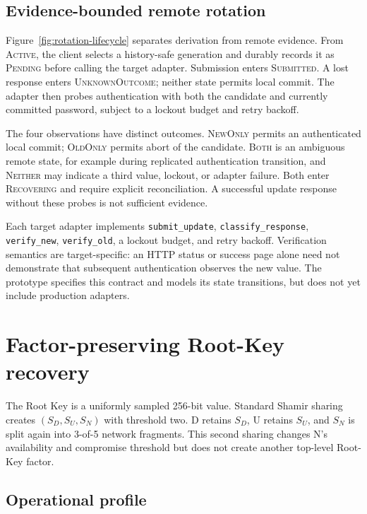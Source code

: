 \documentclass[preprint,12pt]{elsarticle}
\begin{document}
\subsection{Evidence-bounded remote rotation}

Figure~\ref{fig:rotation-lifecycle} separates derivation from remote evidence.
From \textsc{Active}, the client selects a history-safe generation and durably
records it as \textsc{Pending} before calling the target adapter. Submission
enters \textsc{Submitted}. A lost response enters
\textsc{UnknownOutcome}; neither state permits local commit. The adapter then
probes authentication with both the candidate and currently committed
password, subject to a lockout budget and retry backoff.



The four observations have distinct outcomes. \textsc{NewOnly} permits an
authenticated local commit; \textsc{OldOnly} permits abort of the candidate.
\textsc{Both} is an ambiguous remote state, for example during replicated
authentication transition, and \textsc{Neither} may indicate a third value,
lockout, or adapter failure. Both enter \textsc{Recovering} and require explicit
reconciliation. A successful update response without these probes is not
sufficient evidence.

Each target adapter implements
\texttt{submit\_update}, \texttt{classify\_response},
\texttt{verify\_new}, \texttt{verify\_old}, a lockout budget, and retry
backoff. Verification semantics are target-specific: an HTTP status or success
page alone need not demonstrate that subsequent authentication observes the
new value. The prototype specifies this contract and models its state
transitions, but does not yet include production adapters.

\section{Factor-preserving Root-Key recovery}

The Root Key is a uniformly sampled 256-bit value. Standard Shamir sharing
creates $(S_D,S_U,S_N)$ with threshold two. D retains $S_D$, U retains $S_U$,
and $S_N$ is split again into 3-of-5 network fragments. This second sharing
changes N's availability and compromise threshold but does not create another
top-level Root-Key factor.


\FloatBarrier

\subsection{Operational profile}
\end{document}
